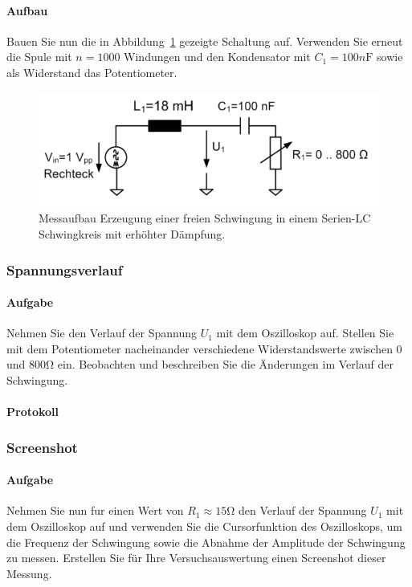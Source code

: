 \documentclass[10pt]{report}
\begin{document}
        \paragraph{Aufbau}
        Bauen Sie nun die in Abbildung~\ref{fig:abb17} gezeigte Schaltung auf. Verwenden Sie erneut
        die Spule mit $n = 1000$ Windungen und den Kondensator mit $C_1 = 100\si{n\farad}$ sowie
        als Widerstand das Potentiometer.
        \begin{center}
            \begin{figure}[H]
                \includegraphics[width=\textwidth]{Abbildung17.png}
                \caption{Messaufbau Erzeugung einer freien Schwingung in einem Serien-LC Schwingkreis
                        mit erhöhter Dämpfung.}
                \label{fig:abb17}
            \end{figure}
        \end{center}

        \subsubsection{Spannungsverlauf}
        \paragraph{Aufgabe}
        Nehmen Sie den Verlauf der Spannung $U_1$ mit dem Oszilloskop auf. Stellen Sie
        mit dem Potentiometer nacheinander verschiedene Widerstandswerte zwischen
        $0$ und $800\si{\ohm}$ ein. Beobachten und beschreiben Sie die Änderungen im Verlauf
        der Schwingung.

        \paragraph{Protokoll}

        \subsubsection{Screenshot}
        \paragraph{Aufgabe}
        Nehmen Sie nun fur einen Wert von $R_1 \approx 15\si{\ohm}$ den Verlauf der Spannung $U_1$
        mit dem Oszilloskop auf und verwenden Sie die Cursorfunktion des Oszilloskops,
        um die Frequenz der Schwingung sowie die Abnahme der Amplitude
        der Schwingung zu messen. Erstellen Sie für Ihre Versuchsauswertung einen
        Screenshot dieser Messung.
\end{document}
